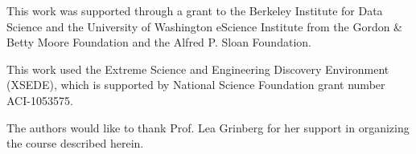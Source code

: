 





\begin{acks}

This work was supported through a grant to the Berkeley Institute for Data
Science and the University of Washington eScience Institute from the Gordon \&
Betty Moore Foundation and the Alfred P. Sloan Foundation.

This work used the Extreme Science and Engineering Discovery Environment
(XSEDE), which is supported by National Science Foundation grant number
ACI-1053575.

The authors would like to thank Prof. Lea Grinberg for her support in organizing the course described herein.

\end{acks}
